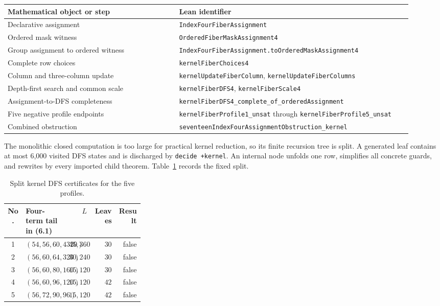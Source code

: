 \documentclass[11pt]{article}
\theoremstyle{definition}
\newcommand{\leanname}[1]{\nolinkurl{#1}}
\begin{document}
\begin{center}
\small
\begin{tabular}{@{}p{0.39\linewidth}p{0.53\linewidth}@{}}
\toprule
Mathematical object or step & Lean identifier \\
\midrule
Declarative assignment & \leanname{IndexFourFiberAssignment} \\
Ordered mask witness & \leanname{OrderedFiberMaskAssignment4} \\
Group assignment to ordered witness &
  \leanname{IndexFourFiberAssignment.toOrderedMaskAssignment4} \\
Complete row choices & \leanname{kernelFiberChoices4} \\
Column and three-column update & \leanname{kernelUpdateFiberColumn},
  \leanname{kernelUpdateFiberColumns} \\
Depth-first search and common scale & \leanname{kernelFiberDFS4},
  \leanname{kernelFiberScale4} \\
Assignment-to-DFS completeness &
  \leanname{kernelFiberDFS4_complete_of_orderedAssignment} \\
Five negative profile endpoints & \leanname{kernelFiberProfile1_unsat}
  through \leanname{kernelFiberProfile5_unsat} \\
Combined obstruction &
  \leanname{seventeenIndexFourAssignmentObstruction_kernel} \\
\bottomrule
\end{tabular}
\end{center}

The monolithic closed computation is too large for practical kernel reduction,
so its finite recursion tree is split. A generated leaf contains at most 6,000
visited DFS states and is discharged by \texttt{decide +kernel}. An internal
node unfolds one row, simplifies all concrete guards, and rewrites by every
imported child theorem. Table~\ref{tab:kernel-certs} records the fixed split.

\begin{table}[ht]
\centering
\small
\begin{tabular}{@{}c p{0.31\linewidth} rrr@{}}
\toprule
No. & Four-term tail in (6.1) & $L$ & Leaves & Result \\
\midrule
1 & $(54,56,60,4320)$ & $45{,}360$ & $30$ & false \\
2 & $(56,60,64,320)$  & $30{,}240$ & $30$ & false \\
3 & $(56,60,80,160)$  & $15{,}120$ & $30$ & false \\
4 & $(56,60,96,120)$  & $15{,}120$ & $42$ & false \\
5 & $(56,72,90,96)$   & $15{,}120$ & $42$ & false \\
\bottomrule
\end{tabular}
\caption{Split kernel DFS certificates for the five profiles.}
\label{tab:kernel-certs}
\end{table}
\end{document}
